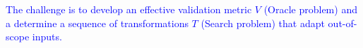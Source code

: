 



\textcolor{blue}{The challenge is to develop an effective validation metric \( V \) (Oracle problem) and a determine a sequence of transformations \( T \) (Search problem) that adapt out-of-scope inputs.}%





